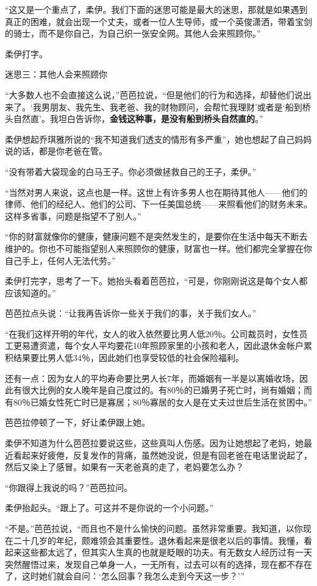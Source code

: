 “这又是一个重点了，柔伊。我们下面的迷思可能是最大的迷思，那就是如果遇到真正的困难，就会出现一个丈夫，或者一位人生导师，或一个英俊潇洒，带着宝剑的骑士，而不是你自己，为自己织一张安全网。其他人会来照顾你。”

柔伊打字。

{\kaishu 迷思三：其他人会来照顾你}

“大多数人也不会直接这么说，”芭芭拉说，“但是他们的行为和选择，却替他们说出来了。‘我男朋友、我先生、我老爸、我的财物顾问，会帮忙我理财’或者是‘船到桥头自然直’。我坦白告诉你，\textbf{金钱这种事，是没有船到桥头自然直的}。”

柔伊想起乔琪雅所说的“我不知道我们透支的情形有多严重”，她也想起了自己妈妈说的话，都是你老爸在管。

“没有带着大袋现金的白马王子。你必须做拯救自己的王子，柔伊。”

“当然对男人来说，这点也是一样。这世上有许多男人也在期待其他人——他们的律师、他们的经纪人、他们的公司、下一任美国总统——来照看他们的财务未来。这样多省事，问题是指望不了别人。”

“你的财富就像你的健康，健康问题不是突然发生的，是要你在生活中每天不断去维护的。你也不可能指望别人来照顾你的健康，财富也一样。他们都完全掌握在你自己手上，任何人无法代劳。”

柔伊打完字，思考了一下。她抬头看着芭芭拉，“可是，你刚刚说这是每个女人都应该知道的。”

芭芭拉点头说：“让我再告诉你一些关于我们的事，关于我们女人。”

“在我们这样开明的年代，女人的收入依然要比男人低20％。公司裁员时，女性员工更易遭资遣，每个女人平均要花10年照顾家里的小孩和老人，因此退休金帐户累积结果要比男人低34％，因此她们也享受较低的社会保险福利。

还有一点：因为女人的平均寿命要比男人长7年，而婚姻有一半是以离婚收场，因此有很大比例的女人晚年是自己度过的。有80％的已婚男子死亡时，尚有婚姻；而有80％已婚女性死亡时已是寡居；80％寡居的女人是在丈夫过世后生活在贫困中。”

芭芭拉停顿了一下，好让柔伊跟上她。

柔伊不知道为什么芭芭拉要说这些，这些真叫人伤感。因为让她想起了老妈，她最近看起来好疲倦，反复发作的背痛，虽然她没说，但是有回老爸在电话里说起了，然后又染上了感冒。如果有一天老爸真的走了，老妈要怎么办？

“你跟得上我说的吗？”芭芭拉问。

柔伊抬起头。“跟上了。可这并不是你说的一个小问题。”

“不是。”芭芭拉说，“而且也不是什么愉快的问题。虽然非常重要。我知道，以你现在二十几岁的年纪，颇难领会其重要性。退休看起来是很老以后的事情。我懂，看起来这些都太远了，但其实人生真的也就是眨眼的功夫。有无数女人经历过有一天突然醒悟过来，发现自己单身一人，一无所有，过去可以有的选择，现在都不存在了，这时她们就会自问：‘怎么回事？我怎么走到今天这一步？’”

